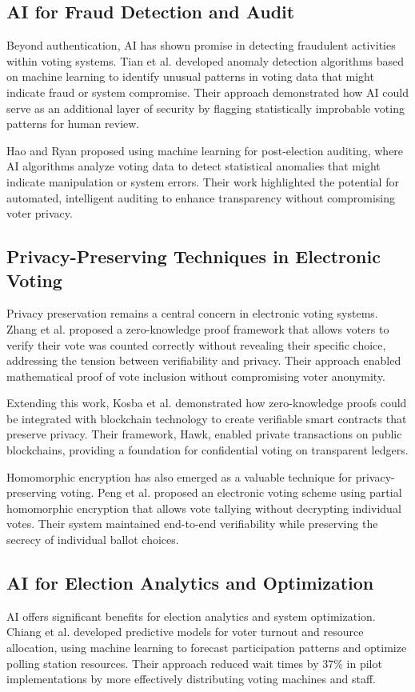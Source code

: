 \documentclass[conference]{IEEEtran}
\begin{document}
\subsection{AI for Fraud Detection and Audit}
Beyond authentication, AI has shown promise in detecting fraudulent activities within voting systems. Tian et al. \cite{b14} developed anomaly detection algorithms based on machine learning to identify unusual patterns in voting data that might indicate fraud or system compromise. Their approach demonstrated how AI could serve as an additional layer of security by flagging statistically improbable voting patterns for human review.

Hao and Ryan \cite{b15} proposed using machine learning for post-election auditing, where AI algorithms analyze voting data to detect statistical anomalies that might indicate manipulation or system errors. Their work highlighted the potential for automated, intelligent auditing to enhance transparency without compromising voter privacy.

\subsection{Privacy-Preserving Techniques in Electronic Voting}
Privacy preservation remains a central concern in electronic voting systems. Zhang et al. \cite{b16} proposed a zero-knowledge proof framework that allows voters to verify their vote was counted correctly without revealing their specific choice, addressing the tension between verifiability and privacy. Their approach enabled mathematical proof of vote inclusion without compromising voter anonymity.

Extending this work, Kosba et al. \cite{b17} demonstrated how zero-knowledge proofs could be integrated with blockchain technology to create verifiable smart contracts that preserve privacy. Their framework, Hawk, enabled private transactions on public blockchains, providing a foundation for confidential voting on transparent ledgers.

Homomorphic encryption has also emerged as a valuable technique for privacy-preserving voting. Peng et al. \cite{b18} proposed an electronic voting scheme using partial homomorphic encryption that allows vote tallying without decrypting individual votes. Their system maintained end-to-end verifiability while preserving the secrecy of individual ballot choices.

\subsection{AI for Election Analytics and Optimization}
AI offers significant benefits for election analytics and system optimization. Chiang et al. \cite{b19} developed predictive models for voter turnout and resource allocation, using machine learning to forecast participation patterns and optimize polling station resources. Their approach reduced wait times by 37\% in pilot implementations by more effectively distributing voting machines and staff.
\end{document}

